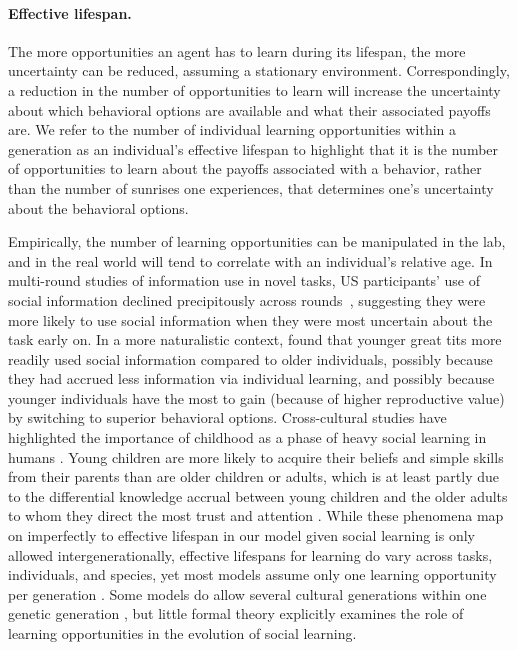 \documentclass[letterpaper,11.5pt]{scrartcl}
\begin{document}
\paragraph{Effective lifespan.} The more opportunities an agent has to learn during its lifespan, the more uncertainty can be reduced, assuming a stationary environment. Correspondingly, a reduction in the number of opportunities to learn will increase the uncertainty about which behavioral options are available and what their associated
payoffs are. %
We refer to the number of individual learning opportunities within a generation as an individual's effective lifespan to highlight that it is the number of opportunities to learn about the payoffs associated with a behavior, rather than the number of sunrises one experiences, that determines one's uncertainty about the behavioral options.  

Empirically, the number of learning opportunities can be manipulated in the lab, and in the real world will tend to correlate with an individual's relative age. In multi-round studies of information use in novel tasks, US participants' use of social
information declined precipitously across rounds~\citep{McElreath2005}, suggesting
they were more likely to use social information when they were most uncertain about the task early on. In a more naturalistic context, \citet{Aplin2017} found that younger great tits more readily used social information compared to older individuals, possibly because they had accrued less information via individual learning, and possibly because younger individuals have the most to gain (because of higher reproductive value) by switching to superior behavioral options. Cross-cultural studies have highlighted the importance of childhood as a phase of heavy social learning in humans \citep{Reyes2016}. Young children are more likely to
acquire their beliefs and simple skills from their parents than are older children
or adults, which is at least partly due to the differential knowledge accrual
between young children and the older adults to whom they direct the most trust and
attention \citep{kline2013teaching}. While these phenomena map on imperfectly to effective lifespan in our model given social learning is only allowed intergenerationally, effective lifespans for learning do vary across tasks, individuals, and species, yet most models assume only one learning opportunity per generation \citep{BoydRicherson1985, Feldman1996,Henrich1998, perreault2012bayesian}. Some models do allow several cultural generations within one genetic generation \citep{Enquist2007,Rendell2010,lindstrom2016co}, but little formal theory explicitly examines the role of learning opportunities in the evolution of social learning. 
\end{document}
